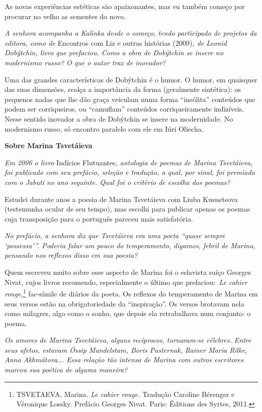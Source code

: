 As novas experiências estéticas são apaixonantes, mas eu também começo
por procurar no velho as sementes do novo.

\emph{A senhora acompanha a Kalinka desde o começo, tendo participado de
projetos da editora, como de} Encontros com Liz e outras histórias
(2009)\emph{, de Leonid Dobýtchin, livro que prefaciou. Como a obra de
Dobýtchin se insere no modernismo russo? O que o autor traz de
inovador?}

Uma das grandes características de Dobýtchin é o humor. O humor, em
quaisquer das suas dimensões, realça a importância da forma (geralmente
sintética): os pequenos nadas que lhe dão graça veiculam numa forma
``insólita'' conteúdos que podem ser corriqueiros, ou ``camuflam''
conteúdos corriqueiramente indizíveis. Nesse sentido inovador a obra de
Dobýtchin se insere na modernidade. No modernismo russo, só encontro
paralelo com ele em Iúri Oliecha.

\textbf{Sobre Marina Tsvetáieva}

\emph{Em 2006 o livro} Indícios Flutuantes\emph{, antologia de poemas de
Marina Tsvetáieva, foi publicado com seu prefácio, seleção e tradução, a
qual, por sinal, foi premiada com o Jabuti no ano seguinte. Qual foi o
critério de escolha dos poemas?}

Estudei durante anos a poesia de Marina Tsvetáieva com Liuba Kusnetsova
(testemunha ocular de seu tempo), mas escolhi para publicar apenas os
poemas cuja transposição para o português pareceu mais satisfatória.

\emph{No prefácio, a senhora diz que Tsvetáieva era uma poeta ``quase
sempre `possessa'''. Poderia falar um pouco do temperamento, digamos,
febril de Marina, pensando nos reflexos disso em sua poesia?}

Quem escreveu muito sobre esse aspecto de Marina foi o eslavista suíço
Georges Nivat, cujos livros recomendo, especialmente o último que
prefaciou:~\emph{Le cahier rouge},\footnote{TSVETAEVA, Marina. \emph{Le
  cahier rouge.} Tradução Caroline Bérenger e Véronique Lossky. Prefácio
  Georges Nivat. Paris: Éditions des Syrtes, 2011.} fac-símile de
diários da poeta. Os reflexos do temperamento de Marina em seus versos
estão na obrigatoriedade da ``inspiração''. Os versos brotavam nela como
milagres, algo como o sonho, que depois ela retrabalhava num conjunto: o
poema.

\emph{Os amores de Marina Tsvetáieva, alguns recíprocos, tornaram-se
célebres. Entre seus afetos, estavam Óssip Mandelstam, Boris Pasternak,
Rainer Maria Rilke, Anna Akhmátova... Essa relação tão intensa de Marina
com outros escritores marcou sua poética de alguma maneira?}

